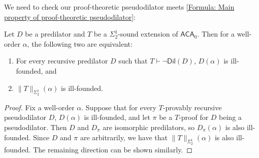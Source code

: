 \documentclass{mhkr}
\newcommand{\Dil}{\mathsf{Dil}}
\newcommand{\ACA}{\mathsf{ACA}}
\begin{document}
We need to check our proof-theoretic pseudodilator meets \eqref{Formula: Main property of proof-theoretic pseudodilator}:
\begin{lemma}[$\ACA_0$] \label{Lemma: Characterization of proof-theoretic pseudodilator}
    Let $D$ be a predilator and $T$ be a $\Sigma^1_2$-sound extension of $\ACA_0$.
    Then for a well-order $\alpha$, the following two are equivalent:
    \begin{enumerate}
        \item For every recursive predilator $D$ such that $T\vdash \lnot\Dil(D)$, $D(\alpha)$ is ill-founded, and
        \item $\|T\|_{\Sigma^1_2}(\alpha)$ is ill-founded.
    \end{enumerate}
\end{lemma}
\begin{proof}
    Fix a well-order $\alpha$.
    Suppose that for every $T$-provably recursive pseudodilator $D$, $D(\alpha)$ is ill-founded, and let $\pi$ be a $T$-proof for $D$ being a pseudodilator. Then $D$ and $D_\pi$ are isomorphic predilators, so $D_\pi(\alpha)$ is also ill-founded. Since $D$ and $\pi$ are arbitrarily, we have that $\|T\|_{\Sigma^1_2}(\alpha)$ is also ill-founded. The remaining direction can be shown similarly.
\end{proof}
\end{document}
